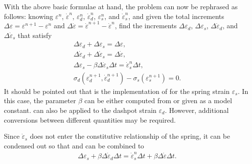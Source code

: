 With the above basic formulae at hand, the problem can now be rephrased as follows: knowing $\varepsilon^n$, $\dot\varepsilon^n$, $\varepsilon^n_d$, $\dot\varepsilon^n_d$, $\varepsilon^n_s$, and $\dot\varepsilon^n_s$, and given the total increments $\Delta\varepsilon=\varepsilon^{n+1}-\varepsilon^n$ and $\Delta\dot\varepsilon=\dot\varepsilon^{n+1}-\dot\varepsilon^n$, find the increments $\Delta\varepsilon_d$, $\Delta\varepsilon_s$, $\Delta\dot\varepsilon_d$, and $\Delta\dot\varepsilon_s$ that satisfy
\begin{gather}
\label{eq:condense_a}\Delta\varepsilon_d+\Delta\varepsilon_s=\Delta\varepsilon,\\
\label{eq:condense_b}\Delta\dot\varepsilon_d+\Delta\dot\varepsilon_s=\Delta\dot\varepsilon,\\
\label{eq:condense_c}\Delta\varepsilon_s-\beta\Delta\dot\varepsilon_s\Delta{}t=\dot\varepsilon^n_s\Delta{}t,\\
\label{eq:condense_d}\sigma_d(\varepsilon^{n+1}_d,\dot\varepsilon^{n+1}_d)-\sigma_s(\varepsilon^{n+1}_s)=0.
\end{gather}
It should be pointed out that  is the implementation of  for the spring strain $\varepsilon_s$.
In this case, the parameter $\beta$ can be either computed from  or given as a model constant.
 can also be applied to the dashpot strain $\varepsilon_d$.
However, additional conversions between different quantities may be required.

Since $\dot\varepsilon_s$ does not enter the constitutive relationship of the spring, it can be condensed out so that  and  can be combined to
\begin{gather}\label{eq:condense_e}
\Delta\varepsilon_s+\beta\Delta\dot\varepsilon_d\Delta{}t=\dot\varepsilon^n_s\Delta{}t+\beta\Delta\dot\varepsilon\Delta{}t.
\end{gather}

